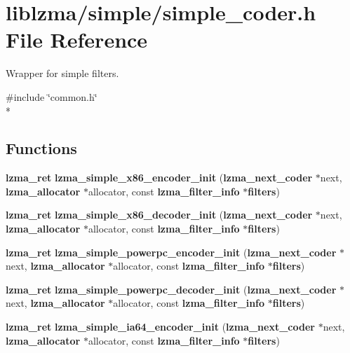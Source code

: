 \section{liblzma/simple/simple\-\_\-coder.h File Reference}
\label{simple__coder_8h}


Wrapper for simple filters.  


{\ttfamily \#include \char`\"{}common.\-h\char`\"{}}\\*
\subsection*{Functions}
\begin{DoxyCompactItemize}
\item 
{\bf lzma\-\_\-ret} {\bfseries lzma\-\_\-simple\-\_\-x86\-\_\-encoder\-\_\-init} ({\bf lzma\-\_\-next\-\_\-coder} $\ast$next, {\bf lzma\-\_\-allocator} $\ast$allocator, const {\bf lzma\-\_\-filter\-\_\-info} $\ast${\bf filters})\label{simple__coder_8h_a69ee1b7153ed8024a2aa3c5825b077b0}

\item 
{\bf lzma\-\_\-ret} {\bfseries lzma\-\_\-simple\-\_\-x86\-\_\-decoder\-\_\-init} ({\bf lzma\-\_\-next\-\_\-coder} $\ast$next, {\bf lzma\-\_\-allocator} $\ast$allocator, const {\bf lzma\-\_\-filter\-\_\-info} $\ast${\bf filters})\label{simple__coder_8h_a4fe7b78ecbed6ff2421208c05ad4eaa1}

\item 
{\bf lzma\-\_\-ret} {\bfseries lzma\-\_\-simple\-\_\-powerpc\-\_\-encoder\-\_\-init} ({\bf lzma\-\_\-next\-\_\-coder} $\ast$next, {\bf lzma\-\_\-allocator} $\ast$allocator, const {\bf lzma\-\_\-filter\-\_\-info} $\ast${\bf filters})\label{simple__coder_8h_a73f37cd37022278bc0925d453b075435}

\item 
{\bf lzma\-\_\-ret} {\bfseries lzma\-\_\-simple\-\_\-powerpc\-\_\-decoder\-\_\-init} ({\bf lzma\-\_\-next\-\_\-coder} $\ast$next, {\bf lzma\-\_\-allocator} $\ast$allocator, const {\bf lzma\-\_\-filter\-\_\-info} $\ast${\bf filters})\label{simple__coder_8h_af575ee7977199d36f9e224e676b05051}

\item 
{\bf lzma\-\_\-ret} {\bfseries lzma\-\_\-simple\-\_\-ia64\-\_\-encoder\-\_\-init} ({\bf lzma\-\_\-next\-\_\-coder} $\ast$next, {\bf lzma\-\_\-allocator} $\ast$allocator, const {\bf lzma\-\_\-filter\-\_\-info} $\ast${\bf filters})\label{simple__coder_8h_a55b736e2c5b460c3383ff503594be15c}


\end{DoxyCompactItemize}
